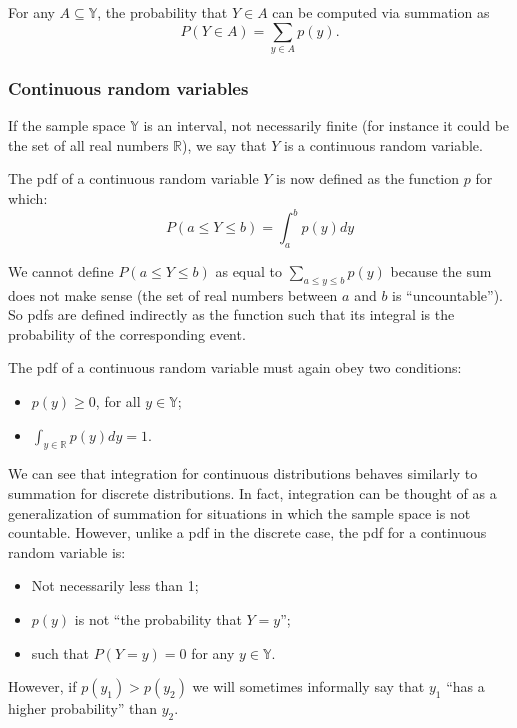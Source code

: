 \documentclass[
]{book}
\begin{document}
For any \(A\subseteq \mathbb{Y}\), the probability that \(Y\in A\) can be computed via summation as
\[
P(Y\in A) = \sum_{y\in A} p(y).
\]

\hypertarget{continuous-random-variables}{%
\subsubsection{Continuous random variables}\label{continuous-random-variables}}

If the sample space \(\mathbb{Y}\) is an interval, not necessarily finite (for instance it could be the set of all real numbers \(\mathbb{R}\)), we say that \(Y\) is a continuous random variable.

The pdf of a continuous random variable \(Y\) is now defined as the function \(p\) for which:
\[
P(a\leq Y \leq b) = \int_a^b p(y)dy
\]

We cannot define \(P(a \leq Y \leq b)\) as equal to \(\sum_{a\leq y \leq b}p(y)\) because the sum does not make sense (the set of real numbers between \(a\) and \(b\) is ``uncountable''). So pdfs are defined indirectly as the function such that its integral is the probability of the corresponding event.

The pdf of a continuous random variable must again obey two conditions:

\begin{itemize}
\item
  \(p(y)\geq 0\), for all \(y\in\mathbb{Y}\);
\item
  \(\int_{y\in\mathbb{R}}p(y)dy =1\).
\end{itemize}

We can see that integration for continuous distributions behaves similarly to summation for discrete distributions. In fact, integration can be thought of as a generalization of summation for situations in which the sample space is not countable. However, unlike a pdf in the discrete case, the pdf for a continuous
random variable is:

\begin{itemize}
\item
  Not necessarily less than 1;
\item
  \(p(y)\) is not ``the probability that \(Y = y\)'';
\item
  such that \(P(Y=y)=0\) for any \(y\in\mathbb{Y}\).
\end{itemize}

However, if \(p(y_1) > p(y_2)\) we will sometimes informally say that \(y_1\) ``has a higher probability'' than \(y_2\).
\end{document}
